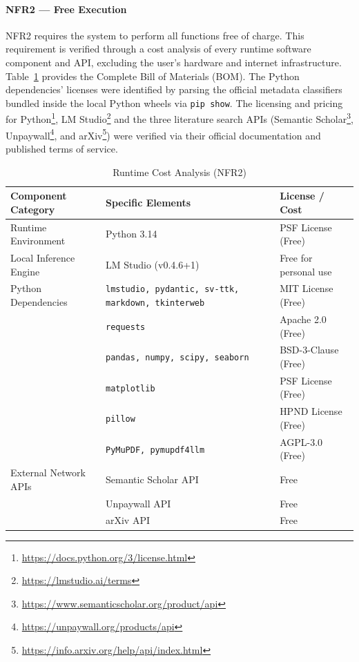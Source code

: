 \paragraph{NFR2 — Free Execution}
NFR2 requires the system to perform all functions free of charge.
This requirement is verified through a cost analysis of every runtime software component and API, excluding the user's hardware and internet infrastructure.
Table~\ref{tab:cost_analysis} provides the Complete Bill of Materials (BOM).
The Python dependencies' licenses were identified by parsing the official metadata classifiers bundled inside the local Python wheels via \texttt{pip show}.
The licensing and pricing for Python\footnote{\url{https://docs.python.org/3/license.html}}, LM Studio\footnote{\url{https://lmstudio.ai/terms}} and the three literature search APIs (Semantic Scholar\footnote{\url{https://www.semanticscholar.org/product/api}}, Unpaywall\footnote{\url{https://unpaywall.org/products/api}}, and arXiv\footnote{\url{https://info.arxiv.org/help/api/index.html}}) were verified via their official documentation and published terms of service.

\begin{table}[htbp]
    \centering
    \caption{Runtime Cost Analysis (NFR2)}
    \label{tab:cost_analysis}
    \begin{tabularx}{\textwidth}{l X l}
        \toprule
        \textbf{Component Category} & \textbf{Specific Elements} & \textbf{License / Cost} \\
        \midrule
        Runtime Environment & Python 3.14 & PSF License (Free) \\
        \addlinespace
        Local Inference Engine & LM Studio (v0.4.6+1) & Free for personal use \\
        Python Dependencies & \texttt{lmstudio, pydantic, sv-ttk, markdown, tkinterweb} & MIT License (Free) \\
        & \texttt{requests} & Apache 2.0 (Free) \\
        & \texttt{pandas, numpy, scipy, seaborn} & BSD-3-Clause (Free) \\
        & \texttt{matplotlib} & PSF License (Free) \\
        & \texttt{pillow} & HPND License (Free) \\
        & \texttt{PyMuPDF, pymupdf4llm} & AGPL-3.0 (Free) \\
        \addlinespace
        External Network APIs & Semantic Scholar API & Free\\
        & Unpaywall API & Free\\
        & arXiv API & Free\\
        \bottomrule
    \end{tabularx}
\end{table}


